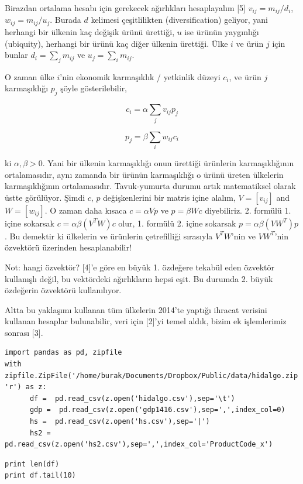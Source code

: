 \documentclass[12pt,fleqn]{article}\usepackage{../../common}
\begin{document}
Birazdan ortalama hesabı için gerekecek ağırlıkları hesaplayalım [5]
$v_{ij} = m_{ij} / d_i$, $w_{ij}=m_{ij}/u_j$. Burada $d$ kelimesi
çeşitlilikten (diversification) geliyor, yani herhangi bir ülkenin kaç
değişik ürünü ürettiği, $u$ ise ürünün yaygınlığı (ubiquity), herhangi bir
ürünü kaç diğer ülkenin ürettiği. Ülke $i$ ve ürün $j$ için bunlar
$d_i = \sum_j m_{ij}$ ve $u_j = \sum_i m_{ij}$.

O zaman ülke $i$'nin ekonomik karmaşıklık / yetkinlik düzeyi $c_i$, ve ürün
$j$ karmaşıklığı $p_j$ şöyle gösterilebilir,

$$
c_i = \alpha \sum_j v_{ij}p_j
$$

$$
p_j  = \beta \sum_i w_{ij} c_i
$$

ki $\alpha,\beta>0$. Yani bir ülkenin karmaşıklığı onun ürettiği ürünlerin
karmaşıklığının ortalamasıdır, aynı zamanda bir ürünün karmaşıklığı o ürünü
üreten ülkelerin karmaşıklığının ortalamasıdır. Tavuk-yumurta durumu artık
matematiksel olarak üstte görülüyor. Şimdi $c$, $p$ değişkenlerini bir
matris içine alalım, $V=[v_{ij}]$ and $W=[w_{ij}]$. O zaman daha kısaca
$c = \alpha V p$ ve $p = \beta W c$ diyebiliriz. 2. formülü 1. içine
sokarsak $c = \alpha \beta (V^T W) c $ olur, 1. formülü 2. içine sokarsak
$p = \alpha \beta (V W^T) p$. Bu demektir ki ülkelerin ve ürünlerin
çetrefilliği sırasıyla $V^T W$'nin ve $V W^T$'nin özvektörü üzerinden
hesaplanabilir!

Not: hangi özvektör? [4]'e göre en büyük 1. özdeğere tekabül eden özvektör
kullanışlı değil, bu vektördeki ağırlıkların hepsi eşit. Bu durumda
2. büyük özdeğerin özvektörü kullanılıyor. 

Altta bu yaklaşımı kullanan tüm ülkelerin 2014'te yaptığı ihracat verisini
kullanan hesaplar bulunabilir, veri için [2]'yi temel aldık, bizim
ek işlemlerimiz sonrası [3].

\begin{verbatim}
import pandas as pd, zipfile
with zipfile.ZipFile('/home/burak/Documents/Dropbox/Public/data/hidalgo.zip', 'r') as z:
      df =  pd.read_csv(z.open('hidalgo.csv'),sep='\t')
      gdp =  pd.read_csv(z.open('gdp1416.csv'),sep=',',index_col=0)
      hs =  pd.read_csv(z.open('hs.csv'),sep='|')
      hs2 =  pd.read_csv(z.open('hs2.csv'),sep=',',index_col='ProductCode_x')
\end{verbatim}

\begin{verbatim}
print len(df)
print df.tail(10)
\end{verbatim}
\end{document}
